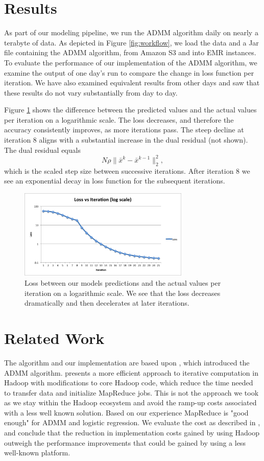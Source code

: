 \documentclass[10pt, conference, compsocconf]{IEEEtran}
\begin{document}
\section{Results}\label{sec:results}
As part of our modeling pipeline, we run the ADMM algorithm daily on nearly a terabyte of data.  As depicted in Figure \ref{fig:workflow}, we load the data and a Jar file containing the ADMM algorithm, from Amazon S3 and into EMR instances.  To evaluate the performance of our implementation of the ADMM algorithm, we examine the output of one day's run to compare the change in loss function per iteration.  We have also examined equivalent results from other days and saw that these results do not vary substantially from day to day.

Figure \ref{fig:iter} shows the difference between the predicted values and the actual values per iteration on a logarithmic scale.  The loss decreases, and therefore the accuracy consistently improves, as more iterations pass.  The steep decline at iteration 8 aligns with a substantial increase in the dual residual (not shown).  The dual residual equals
$$N\rho\|\bar{x}^k-\bar{x}^{k-1}\|^2_2,$$
which is the scaled step size between successive iterations. After iteration 8 we see an exponential decay in loss function for the subsequent iterations.

\begin{figure}[!t]
\centering
\includegraphics[width=3.2in]{iter_rnorm_plot}
\caption{Loss between our models predictions and the actual values per iteration on a logarithmic scale.  We see that the loss decreases dramatically and then decelerates at later iterations.}
\label{fig:iter}
\end{figure}

\section{Related Work}\label{sec:related}
The algorithm and our implementation are based upon \cite{boyd}, which introduced the ADMM algorithm.  \cite{bu2010} presents a more efficient approach to iterative computation in Hadoop with modifications to core Hadoop code, which reduce the time needed to transfer data and initialize MapReduce jobs.  This is not the approach we took as we stay within the Hadoop ecosystem and avoid the ramp-up costs associated with a less well known solution.  Based on our experience MapReduce is "good enough" for ADMM and logistic regression.  We evaluate the cost as described in \cite{lin2012}, and conclude that the reduction in implementation costs gained by using Hadoop outweigh the performance improvements that could be gained by using a less well-known platform. 
\end{document}
